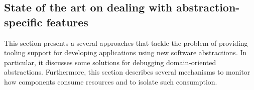 %
%
%
%
%
%
%

\subsection{State of the art on dealing with abstraction-specific features}

This section presents a several approaches that tackle the problem of providing tooling support for developing applications using new software abstractions.
In particular, it discusses some solutions for debugging domain-oriented abstractions.
Furthermore, this section describes several mechanisms to monitor how components consume resources and to isolate such consumption.

